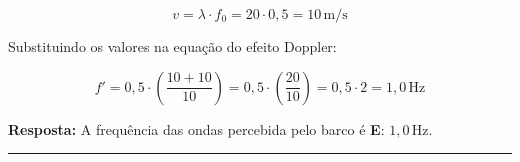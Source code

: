 \documentclass[a4paper,12pt]{article}
\begin{document}
\begin{flushleft}
\begin{equation}
v = \lambda \cdot f_0 = 20 \cdot 0{,}5 = 10\,\text{m/s}
\end{equation}

\noindent
Substituindo os valores na equação do efeito Doppler:

\begin{equation}
f' = 0{,}5 \cdot \left( \frac{10 + 10}{10} \right) = 0{,}5 \cdot \left( \frac{20}{10} \right) = 0{,}5 \cdot 2 = 1{,}0\,\text{Hz}
\end{equation}

\noindent
\textbf{Resposta:} A frequência das ondas percebida pelo barco é \colorbox{green!50}{\textbf{E}}: \( \boxed{1{,}0\,\text{Hz}} \).

\end{flushleft}

\noindent\rule{\linewidth}{0.6pt}\\
\end{document}
